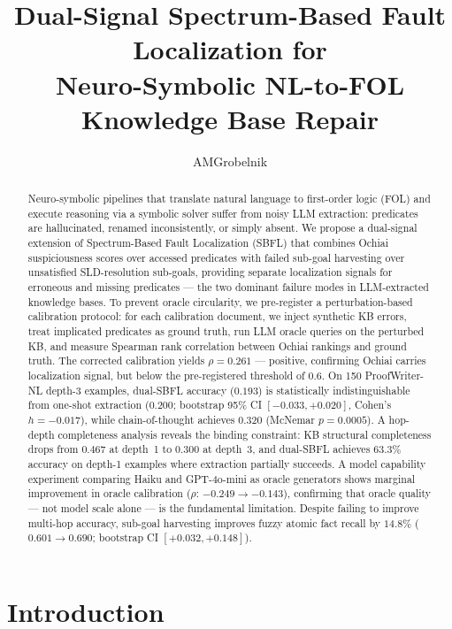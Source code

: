 \documentclass[11pt,letterpaper]{article}
\title{\textbf{Dual-Signal Spectrum-Based Fault Localization for\\
Neuro-Symbolic NL-to-FOL Knowledge Base Repair}}
\author{AMGrobelnik}
\date{}
\begin{document}
\maketitle

\begin{abstract}
Neuro-symbolic pipelines that translate natural language to first-order logic (FOL) and execute reasoning via a symbolic solver suffer from noisy LLM extraction: predicates are hallucinated, renamed inconsistently, or simply absent. We propose a dual-signal extension of Spectrum-Based Fault Localization (SBFL) that combines Ochiai suspiciousness scores over accessed predicates with failed sub-goal harvesting over unsatisfied SLD-resolution sub-goals, providing separate localization signals for erroneous and missing predicates — the two dominant failure modes in LLM-extracted knowledge bases. To prevent oracle circularity, we pre-register a perturbation-based calibration protocol: for each calibration document, we inject synthetic KB errors, treat implicated predicates as ground truth, run LLM oracle queries on the perturbed KB, and measure Spearman rank correlation between Ochiai rankings and ground truth. The corrected calibration yields $\rho = 0.261$ — positive, confirming Ochiai carries localization signal, but below the pre-registered threshold of $0.6$. On 150 ProofWriter-NL depth-3 examples, dual-SBFL accuracy ($0.193$) is statistically indistinguishable from one-shot extraction ($0.200$; bootstrap 95\% CI $[-0.033, +0.020]$, Cohen's $h = -0.017$), while chain-of-thought achieves $0.320$ (McNemar $p = 0.0005$). A hop-depth completeness analysis reveals the binding constraint: KB structural completeness drops from $0.467$ at depth~1 to $0.300$ at depth~3, and dual-SBFL achieves $63.3\%$ accuracy on depth-1 examples where extraction partially succeeds. A model capability experiment comparing Haiku and GPT-4o-mini as oracle generators shows marginal improvement in oracle calibration ($\rho$: $-0.249 \to -0.143$), confirming that oracle quality — not model scale alone — is the fundamental limitation. Despite failing to improve multi-hop accuracy, sub-goal harvesting improves fuzzy atomic fact recall by $14.8\%$ ($0.601 \to 0.690$; bootstrap CI $[+0.032, +0.148]$).
\end{abstract}

\section{Introduction}
\end{document}
